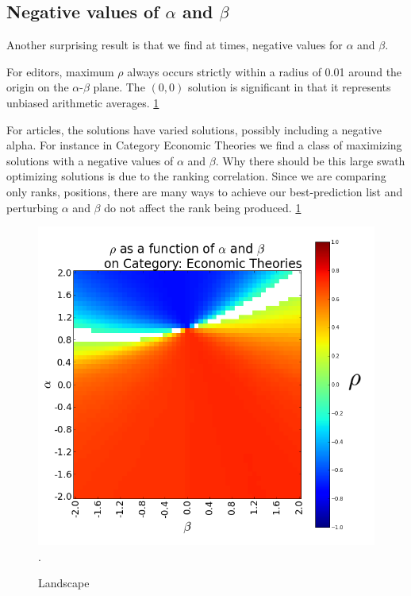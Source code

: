 \documentclass{acm_proc_article-sp}
\begin{document}
\subsection{Negative values of $\alpha$ and $\beta$}
Another surprising result is that we find at times, negative values for $\alpha$ and $\beta$.


For editors, maximum $\rho$ always occurs strictly within a radius of 0.01 around the origin on the  $\alpha$-$\beta$ plane. The $(0,0)$ solution is significant in that it represents unbiased arithmetic averages.
\ref{fig:landscape}

For articles, the solutions have varied solutions, possibly including a negative alpha. For instance in Category Economic Theories we find a class of maximizing solutions with a negative values of $\alpha$ and $\beta$. Why there should be this large swath optimizing solutions is due to the ranking correlation. Since we are comparing only ranks, positions, there are many ways to achieve our best-prediction list and perturbing $\alpha$ and $\beta$ do not affect the rank being produced. \ref{fig:landscape} 

\begin{figure}[!t]
\centering
\includegraphics[width=0.9\columnwidth]{landscape.png}.
\caption{Landscape}
\label{fig:landscape}
\end{figure}
\end{document}
